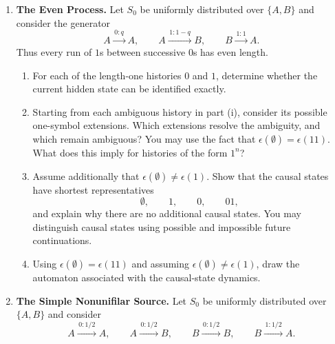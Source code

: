 \documentclass[11pt]{article}
\begin{document}
\begin{exercise}
\begin{enumerate}
\begin{enumerate}
        \item Under the assumption in part (iii), draw the automaton
          associated with the causal-state dynamics.
      \end{enumerate}

    \item \textbf{The Even Process.}
      Let $S_0$ be uniformly distributed over $\{A,B\}$ and consider the
      generator
      \[
        A\xrightarrow{\,0:q\,}A,
        \qquad
        A\xrightarrow{\,1:1-q\,}B,
        \qquad
        B\xrightarrow{\,1:1\,}A.
      \]
      Thus every run of $1$s between successive $0$s has even length.

      \begin{enumerate}
        \item For each of the length-one histories $0$ and $1$, determine
          whether the current hidden state can be identified exactly.

        \item Starting from each ambiguous history in part (i), consider its
          possible one-symbol extensions. Which extensions resolve the
          ambiguity, and which remain ambiguous? You may use the fact that
          $\epsilon(\emptyset)=\epsilon(11)$. What does this imply for
          histories of the form $1^n$?

        \item Assume additionally that
          $\epsilon(\emptyset)\neq\epsilon(1)$. Show that the causal states
          have shortest representatives
          \[
            \emptyset,\qquad 1,\qquad 0,\qquad 01,
          \]
          and explain why there are no additional causal states. You may
          distinguish causal states using possible and impossible future
          continuations.

        \item Using $\epsilon(\emptyset)=\epsilon(11)$ and assuming
          $\epsilon(\emptyset)\neq\epsilon(1)$, draw the automaton associated
          with the causal-state dynamics.
      \end{enumerate}

    \item \textbf{The Simple Nonunifilar Source.}
      Let $S_0$ be uniformly distributed over $\{A,B\}$ and consider
      \[
        A\xrightarrow{\,0:1/2\,}A,
        \qquad
        A\xrightarrow{\,0:1/2\,}B,
        \qquad
        B\xrightarrow{\,0:1/2\,}B,
        \qquad
        B\xrightarrow{\,1:1/2\,}A.
      \]


\end{enumerate}
\end{exercise}
\end{document}
